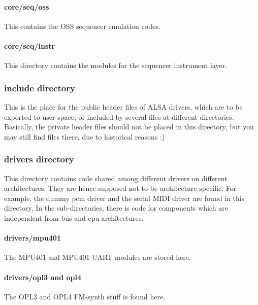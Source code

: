 \documentclass[a4paper,8pt,english]{sphinxmanual}
\begin{document}
\paragraph{core/seq/oss}
\label{sound/kernel-api/writing-an-alsa-driver:core-seq-oss}
This contains the OSS sequencer emulation codes.


\paragraph{core/seq/instr}
\label{sound/kernel-api/writing-an-alsa-driver:core-seq-instr}
This directory contains the modules for the sequencer instrument layer.


\subsubsection{include directory}
\label{sound/kernel-api/writing-an-alsa-driver:include-directory}
This is the place for the public header files of ALSA drivers, which are
to be exported to user-space, or included by several files at different
directories. Basically, the private header files should not be placed in
this directory, but you may still find files there, due to historical
reasons :)


\subsubsection{drivers directory}
\label{sound/kernel-api/writing-an-alsa-driver:drivers-directory}
This directory contains code shared among different drivers on different
architectures. They are hence supposed not to be architecture-specific.
For example, the dummy pcm driver and the serial MIDI driver are found
in this directory. In the sub-directories, there is code for components
which are independent from bus and cpu architectures.


\paragraph{drivers/mpu401}
\label{sound/kernel-api/writing-an-alsa-driver:drivers-mpu401}
The MPU401 and MPU401-UART modules are stored here.


\paragraph{drivers/opl3 and opl4}
\label{sound/kernel-api/writing-an-alsa-driver:drivers-opl3-and-opl4}
The OPL3 and OPL4 FM-synth stuff is found here.
\end{document}
